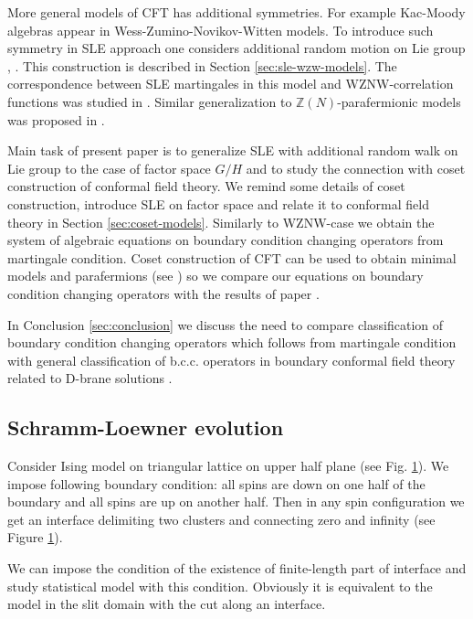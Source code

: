 \documentclass[a4paper]{jpconf}
\theoremstyle{definition}
\theoremstyle{definition} \newtheorem{Def}{Definition}
\begin{document}
More general models of CFT has additional symmetries. For example Kac-Moody algebras  appear in Wess-Zumino-Novikov-Witten models. To introduce such symmetry in SLE approach one considers additional random motion on Lie group \cite{bettelheim2005stochastic}, \cite{Rasmussen:2004xr}. This construction is described in Section \ref{sec:sle-wzw-models}. The correspondence between SLE martingales in this model and WZNW-correlation functions was studied in \cite{alekseev2010sle}. Similar generalization to $\mathbb{Z}(N)$-parafermionic models was proposed in \cite{santachiara2008sle,picco2008numerical}. 

Main task of present paper is to generalize SLE with additional random walk on Lie group to the case of factor space $G/H$ and to study the connection with coset construction  of conformal field theory. We remind some details of coset construction, introduce SLE on factor space and relate it to conformal field theory in Section  \ref{sec:coset-models}. Similarly to WZNW-case we obtain the system of algebraic equations on boundary condition changing operators from martingale condition. 
Coset construction of CFT can be used to obtain minimal models and parafermions (see \cite{difrancesco1997cft}) so we compare our equations on boundary condition changing operators with the results of paper \cite{santachiara2008sle}.

In Conclusion \ref{sec:conclusion} we discuss the need to compare classification of boundary condition changing operators which follows from martingale condition with general classification of b.c.c. operators in boundary conformal field theory related to D-brane solutions \cite{fuchs2005geometry,fredenhagen2002d,elitzur2002d,Maldacena:2001ky,felder1999geometry,alekseev1999d}. 

\subsection{Schramm-Loewner evolution}
\label{sec:schr-loewn-evol}
Consider Ising model on triangular lattice on upper half plane (see Fig. \ref{fig:sle}). We impose following boundary condition: all spins are down on one half of the boundary and all spins are up on another half. Then in any spin configuration we get an interface delimiting two clusters and connecting zero and infinity (see Figure \ref{fig:sle}).

\begin{figure}[h]
  \label{fig:sle}
\end{figure}
We can impose the condition of the existence of finite-length part of interface and study statistical model with this condition. Obviously it is equivalent to the model in the slit domain with the cut along an interface. 
\end{document}
